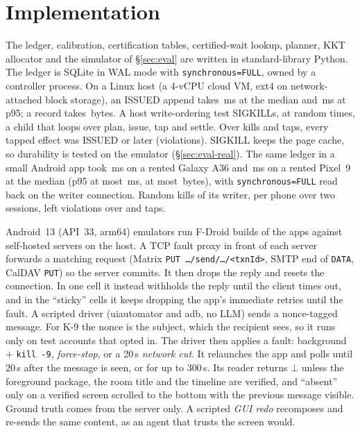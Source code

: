 \section{Implementation}
\label{sec:impl}

The ledger, calibration, certification tables, certified-wait lookup, planner, KKT allocator and the simulator of \S\ref{sec:eval} are written in standard-library Python. The ledger is SQLite
in WAL mode with \texttt{synchronous=FULL}, owned by a controller process. On a Linux host (a 4-vCPU cloud VM, ext4 on network-attached block storage), an \textsf{ISSUED} append takes \LedgerPfifty\,ms at the median
and \LedgerPninetyfive\,ms at p95; a record takes \LedgerBytes\,bytes.
A host write-ordering test SIGKILLs, at random times, a child that loops over plan, issue, tap and settle. Over \LedgerTrials kills and \LedgerTaps taps, every tapped effect
was \textsf{ISSUED} or later (\LedgerViol violations). SIGKILL keeps the page cache, so durability is tested on the emulator (\S\ref{sec:eval-real}). The same ledger in a small
Android app took \LedgerPhoneSamMedMs\,ms on a rented Galaxy A36 and \LedgerPhonePixMedMs\,ms on a rented Pixel~9 at the median (p95 at most \LedgerPhonePixNinetyFiveMs\,ms, at most \LedgerPhoneSamBytes\,bytes), with \texttt{synchronous=FULL} read back on the writer connection.
Random kills of its writer, \LedgerPhoneSamKillN{} per phone over two sessions, left \LedgerPhoneViol{} violations over \LedgerPhoneSamTapN{} and \LedgerPhonePixTapN{} taps.

 Android~13 (API~33, arm64) emulators run F-Droid builds of the apps against self-hosted servers on the host. A TCP fault proxy in front of
each server forwards a matching request (Matrix \texttt{PUT \dots/send/\dots/<txnId>}, SMTP end of \texttt{DATA}, CalDAV \texttt{PUT}) so the server commits. It then drops the reply
and resets the connection. In one cell it instead withholds the reply until the client times out, and in the ``sticky'' cells it keeps dropping the app's immediate retries until
the fault. A scripted driver (uiautomator and adb, no LLM) sends a nonce-tagged message. For K-9 the nonce is the subject, which the
recipient sees, so it runs only on test accounts that opted in. The driver then applies a fault: background + \texttt{kill -9}, \emph{force-stop}, or a
20\,s \emph{network cut}. It relaunches the app and polls until 20\,s after the message is seen, or for up to 300\,s. Its reader returns $\bot$ unless the foreground package,
the room title and the timeline are verified, and ``absent'' only on a verified screen scrolled to the bottom with the previous message visible. Ground truth comes from the
server only. A scripted \emph{GUI redo} recomposes and re-sends the same content, as an agent that trusts the screen would.

